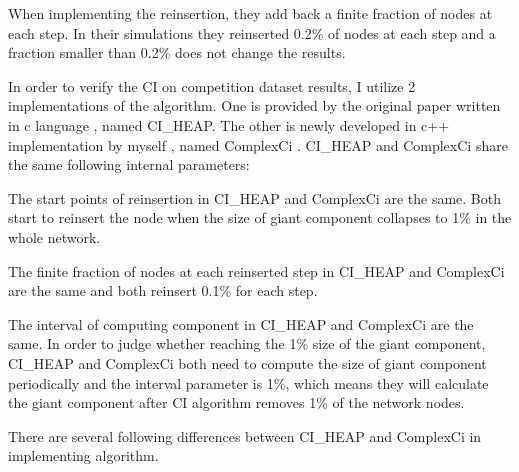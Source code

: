 \documentclass{article}
\begin{document}
	When implementing the reinsertion, they add back a finite fraction of nodes at each step. In their simulations they reinserted 0.2\% of nodes at each step and a fraction smaller than 0.2\% does not change the results.
	
	In order to verify the CI on competition dataset results, I utilize 2 implementations of the algorithm. One is provided by the original paper written in c language \cite{ciheapccode}, named CI\_HEAP. The other is newly developed in c++ implementation by myself \cite{zhfkt2017887989} \cite{zhfktgithub}, named ComplexCi . 
	CI\_HEAP and ComplexCi share the same following internal parameters:
	
	
		\begin{enumerate}
		\begin{item}
			The start points of reinsertion in CI\_HEAP and ComplexCi are the same. Both start to reinsert the node when the size of giant component collapses to 1\% in the whole network.
		\end{item}
		\begin{item}
			The finite fraction of nodes at each reinserted step in CI\_HEAP and ComplexCi are the same and both reinsert 0.1\% for each step.
		\end{item}
		\begin{item}
			The interval of computing component in CI\_HEAP and ComplexCi are the same. In order to judge whether reaching the 1\% size of the giant component, CI\_HEAP and ComplexCi both need to compute the size of giant component periodically and the interval parameter is 1\%, which means they will calculate the giant component after CI algorithm removes 1\% of the network nodes.
		\end{item}	
	\end{enumerate}	
	
	There are several following differences between CI\_HEAP and ComplexCi in implementing algorithm.
	
\end{document}
